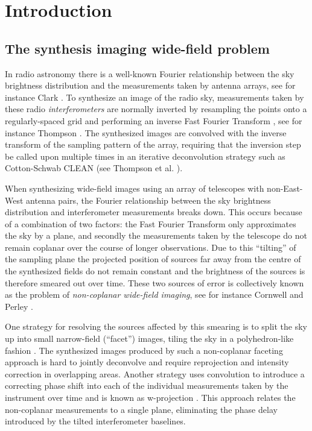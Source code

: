 \chapter{Introduction}
\section{The synthesis imaging wide-field problem}
In radio astronomy there is a well-known Fourier relationship between the sky brightness distribution and the measurements taken by antenna arrays, see for instance 
Clark \cite[Lecture 1]{taylor1999synthesis}. To synthesize an image of the radio sky, measurements taken by these radio \textit{interferometers}
are normally inverted by resampling the points onto a regularly-spaced grid and performing an inverse Fast Fourier Transform \cite{cochran1967fast}, see for instance 
Thompson \cite{thompson1974interpolation}. The synthesized images are convolved with the inverse transform of the sampling pattern of the array, requiring that
the inversion step be called upon multiple times in an iterative deconvolution strategy such as Cotton-Schwab CLEAN (see Thompson et al. \cite[ch 11]{thompson2008interferometry}).

When synthesizing wide-field images using an array of telescopes with non-East-West antenna pairs, the Fourier relationship between the sky brightness 
distribution and interferometer measurements breaks down. This occurs because of a combination of two factors: the Fast Fourier Transform only approximates the sky by a plane, and secondly 
the measurements taken by the telescope do not remain coplanar over the course of longer observations. Due to this ``tilting'' of the sampling plane the projected position of 
sources far away from the centre of the synthesized fields do not remain constant and the brightness of the sources is therefore smeared out over time. These two sources of error is 
collectively known as the problem of \textit{non-coplanar wide-field imaging}, see for instance Cornwell and Perley \cite{cornwell1992radio}.

One strategy for resolving the sources affected by this smearing is to split the sky up into small narrow-field (``facet'') images, tiling the sky in a 
polyhedron-like fashion \cite{cornwell1992radio}. The synthesized images produced by such a non-coplanar faceting approach is hard to jointly deconvolve and 
require reprojection and intensity correction in overlapping areas. Another strategy uses 
convolution to introduce a correcting phase shift into each of the individual measurements taken by the instrument over time and is known as w-projection \cite{cornwell2008noncoplanar}. This approach
relates the non-coplanar measurements to a single plane, eliminating the phase delay introduced by the tilted interferometer baselines. 

